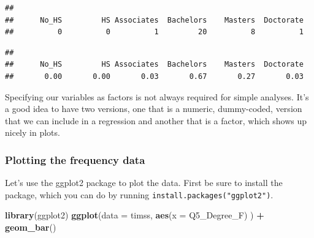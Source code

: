\documentclass[
]{article}
\newenvironment{Shaded}{\begin{snugshade}}{\end{snugshade}}
\newcommand{\DataTypeTok}[1]{\textcolor[rgb]{0.13,0.29,0.53}{#1}}
\newcommand{\DecValTok}[1]{\textcolor[rgb]{0.00,0.00,0.81}{#1}}
\newcommand{\KeywordTok}[1]{\textcolor[rgb]{0.13,0.29,0.53}{\textbf{#1}}}
\newcommand{\NormalTok}[1]{#1}
\newcommand{\OperatorTok}[1]{\textcolor[rgb]{0.81,0.36,0.00}{\textbf{#1}}}
\newcommand{\StringTok}[1]{\textcolor[rgb]{0.31,0.60,0.02}{#1}}
\begin{document}
\begin{Shaded}
\end{Shaded}

\begin{verbatim}
## 
##      No_HS         HS Associates  Bachelors    Masters  Doctorate 
##          0          0          1         20          8          1
\end{verbatim}

\begin{Shaded}
\end{Shaded}

\begin{verbatim}
## 
##      No_HS         HS Associates  Bachelors    Masters  Doctorate 
##       0.00       0.00       0.03       0.67       0.27       0.03
\end{verbatim}

Specifying our variables as factors is not always required for simple analyses. It's a good idea to have two versions, one that is a numeric, dummy-coded, version that we can include in a regression and another that is a factor, which shows up nicely in plots.

\hypertarget{plotting-the-frequency-data}{%
\subsubsection{Plotting the frequency data}\label{plotting-the-frequency-data}}

Let's use the ggplot2 package to plot the data. First be sure to install the package, which you can do by running \texttt{install.packages("ggplot2")}.

\begin{Shaded}
\begin{Highlighting}[]
\KeywordTok{library}\NormalTok{(ggplot2)}
\KeywordTok{ggplot}\NormalTok{(}\DataTypeTok{data =}\NormalTok{ timss, }\KeywordTok{aes}\NormalTok{(}\DataTypeTok{x =}\NormalTok{ Q5_Degree_F) ) }\OperatorTok{+}
\StringTok{ }\KeywordTok{geom_bar}\NormalTok{() }
\end{Highlighting}
\end{Shaded}
\end{document}
